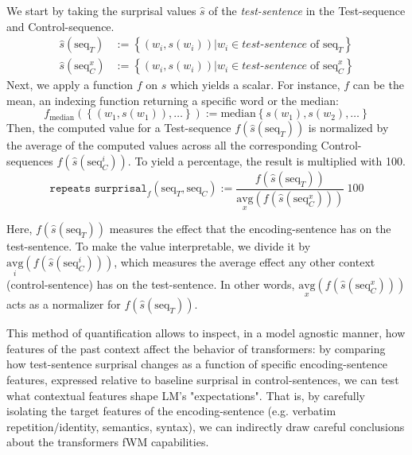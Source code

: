 We start by taking the surprisal values $\hat{s}$ of the \textit{test-sentence} in the Test-sequence and Control-sequence.
\begin{align}
    \hat{s}\left(\text{seq}_T\right) &:= \left\{\left(w_i, s(w_i)\right) | w_i \in \textit{test-sentence}\;\text{of seq}_T\right\}\\
    \hat{s}\left(\text{seq}_C^x\right) &:= \left\{\left(w_i, s(w_i)\right) | w_i \in \textit{test-sentence}\;\text{of seq}_C^x\right\}
\end{align}
Next, we apply a function $f$ on $\hat{s}$ which yields a scalar.
For instance, $f$ can be the mean, an indexing function returning a specific word or the median:
\begin{equation}\label{eq:f_median}
    f_{\text{median}}\left(\left\{\left(w_1, s(w_1)\right), \dots \right\}\right) := \text{median}\left\{s(w_1), s(w_2), \dots \right\}
\end{equation}
Then, the computed value for a Test-sequence $f\left(\hat{s}\left(\text{seq}_T\right)\right)$ is normalized by the average of the computed values across all the corresponding Control-sequences $f\left(\hat{s}\left(\text{seq}_C^i\right)\right)$.
To yield a percentage, the result is multiplied with 100.
\begin{equation}\label{eq:repeat_surprisal}
    \texttt{repeats surprisal}_f\left(\text{seq}_T, \text{seq}_C\right) := \frac{f\left(\hat{s}\left(\text{seq}_T\right)\right)}{\underset{x}{\text{avg}}\left(f\left(\hat{s}\left(\text{seq}_C^x\right)\right)\right)}\:100
\end{equation}

Here, $f\left(\hat{s}\left(\text{seq}_T\right)\right)$ measures the effect that the encoding-sentence has on the test-sentence.
To make the value interpretable, we divide it by $\underset{i}{\text{avg}}\left(f\left(\hat{s}\left(\text{seq}_C^i\right)\right)\right)$, which measures the average effect any other context (control-sentence) has on the test-sentence.
In other words, $\underset{x}{\text{avg}}\left(f\left(\hat{s}\left(\text{seq}_C^x\right)\right)\right)$ acts as a normalizer for $f\left(\hat{s}\left(\text{seq}_T\right)\right)$.

This method of quantification allows to inspect, in a model agnostic manner, how features of the past context affect the behavior of transformers: by comparing how test-sentence surprisal changes as a function of specific encoding-sentence features, expressed relative to baseline surprisal in control-sentences, we can test what contextual features shape LM's "expectations".
That is, by carefully isolating the target features of the encoding-sentence (e.g. verbatim repetition/identity, semantics, syntax), we can indirectly draw careful conclusions about the transformers fWM capabilities.

